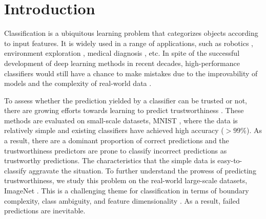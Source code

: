 \section{Introduction}

Classification is a ubiquitous learning problem that categorizes objects according to input features.
It is widely used in a range of applications, such as robotics \cite{Leidner_IROS_2015}, environment exploration \cite{Cate_SEG_2017}, medical diagnosis \cite{Sanz_ASC_2014}, etc.
In spite of the successful development of deep learning methods in recent decades, high-performance classifiers would still have a chance to make mistakes due to the improvability of models and the complexity of real-world data \cite{Krizhevsky_NIPS_2012,He_CVPR_2016,Tan_ICML_2019,Dosovitskiy_ICLR_2021}.

To assess whether the prediction yielded by a classifier can be trusted or not, there are growing efforts towards learning to predict trustworthiness \cite{Jiang_NIPS_2018,Corbiere_NIPS_2019}.
These methods are evaluated on small-scale datasets, \eg MNIST \cite{Lecun_IEEE_1998}, where the data is relatively simple and existing classifiers have achieved high accuracy ($>99\%$).
As a result, there are a dominant proportion of correct predictions and the trustworthiness predictors are prone to classify incorrect predictions as trustworthy predictions.
The characteristics that the simple data is easy-to-classify aggravate the situation.
To further understand the prowess of predicting trustworthiness, we study this problem on the real-world large-scale datasets, \ie ImageNet \cite{Deng_CVPR_2009}.
This is a challenging theme for classification in terms of boundary complexity, class ambiguity, and feature dimensionality \cite{Basu_Springer_2006}.
As a result, failed predictions are inevitable. %


